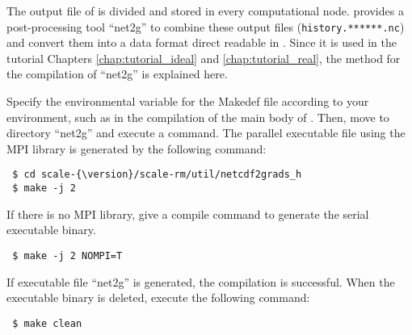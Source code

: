 The output file of \scalerm is divided and stored in every computational node.
\scalelib provides a post-processing tool ``net2g''  to combine these output files
(\verb|history.******.nc|) 
and convert them into a data format direct readable in \grads.
Since it is used in the tutorial Chapters \ref{chap:tutorial_ideal} and \ref{chap:tutorial_real}, the method for the compilation of ``net2g'' is explained here.

Specify the environmental variable for the Makedef file according to your environment,
such as in the compilation of the main body of \scalelib. Then, move to directory  ``net2g'' and execute a command. The parallel executable file using the MPI library is generated by the following command:
\begin{verbatim}
 $ cd scale-{\version}/scale-rm/util/netcdf2grads_h
 $ make -j 2
\end{verbatim}
If there is no MPI library, 
give a compile command to generate the serial executable binary.
\begin{verbatim}
 $ make -j 2 NOMPI=T
\end{verbatim}
If executable file ``net2g'' is generated, the compilation is successful.
When the executable binary is deleted, execute the following command:
\begin{verbatim}
 $ make clean
\end{verbatim}



